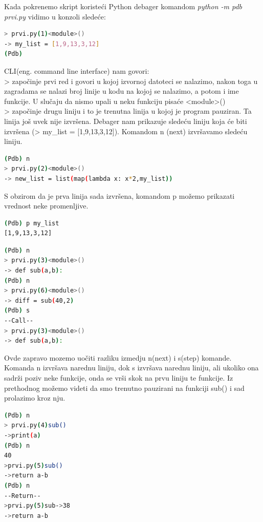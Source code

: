 \documentclass[a4paper]{article}
\begin{document}
Kada pokrenemo skript koristeći Python debager komandom \emph{python -m pdb prvi.py} vidimo u konzoli sledeće:
\begin{lstlisting}[language = bash, caption={Ulazak u Pdb prompt}]
> prvi.py(1)<module>()
-> my_list = [1,9,13,3,12]
(Pdb)
\end{lstlisting}
CLI(eng. command line interface) nam govori:\\
> započinje prvi red i govori u kojoj izvornoj datoteci se nalazimo, nakon toga u zagradama se nalazi broj linije u kodu na kojoj se nalazimo, a potom i ime funkcije. U slučaju da nismo upali u neku funkciju pisaće <module>()\\
\textendash>  započinje drugu liniju i to je trenutna linija u kojoj je program pauziran. Ta linija još uvek nije izvršena. Debager nam prikazuje sledeću liniju koja će biti izvršena 
(\textendash> my\_list = [1,9,13,3,12]).
Komandom n (next) izvršavamo sledeću liniju.
\begin{lstlisting}[language = bash, caption={Izvršavanje prve linije k\^{o}da}]
(Pdb) n
> prvi.py(2)<module>()
-> new_list = list(map(lambda x: x*2,my_list))
\end{lstlisting}

S obzirom da je prva linija sada izvršena, komandom p možemo prikazati vrednost neke
 promenljive.
\begin{lstlisting}[language = bash, caption={Štampanje promenljive \emph{my\_list}}]
(Pdb) p my_list
[1,9,13,3,12]
\end{lstlisting}
\begin{lstlisting}[language = bash, caption={Izvršavanje naredne dve linije i ulazak u funkciju \emph{sub(40, 2)}}]
(Pdb) n
> prvi.py(3)<module>()
-> def sub(a,b):
(Pdb) n
> prvi.py(6)<module>()
-> diff = sub(40,2)
(Pdb) s
--Call--
> prvi.py(3)<module>()
-> def sub(a,b):
\end{lstlisting}

Ovde zapravo mozemo uočiti razliku izmedju n(next) i s(step) komande. Komanda n izvršava narednu liniju, dok s izvršava narednu liniju, ali ukoliko ona sadrži poziv neke funkcije, onda se vrši skok na prvu liniju te funkcije. Iz prethodnog možemo videti da smo trenutno pauzirani na funkciji sub() i sad prolazimo kroz nju.
\begin{lstlisting}[language = bash, caption={Izvršavamo prve tri linije u funkciji \emph{sub(40, 2)}}]
(Pdb) n
> prvi.py(4)sub()
->print(a)
(Pdb) n
40
>prvi.py(5)sub()
->return a-b
(Pdb) n
--Return--
>prvi.py(5)sub->38
->return a-b
\end{lstlisting}
\end{document}
